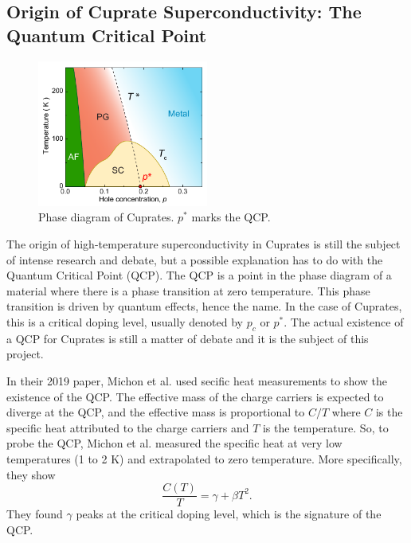 \subsection{Origin of Cuprate Superconductivity: The Quantum Critical Point}
\begin{figure}
    \centering
    \includegraphics[width=0.5\textwidth]{figures/phase_diagram}
    \caption{Phase diagram of Cuprates. $p^*$ marks the QCP.}
    \label{fig:phase_diagram}
\end{figure}

The origin of high-temperature superconductivity in Cuprates is still the subject of intense
research and debate, but a possible explanation has to do with the Quantum Critical Point (QCP).
The QCP is a point in the phase diagram of a material where there is a phase transition at zero
temperature. This phase transition is driven by quantum effects, hence the name. In the case of
Cuprates, this is a critical doping level, usually denoted by $p_c$ or $p^*$. The actual existence
of a QCP for Cuprates is still a matter of debate and it is the subject of this project.

In their 2019 paper, Michon et al. \cite{michon2019} used secific heat measurements to
show the existence of the QCP. The effective mass of the charge carriers is expected to diverge at
the QCP, and the effective mass is proportional to $C/T$ where $C$ is the specific heat attributed
to the charge carriers and $T$ is the temperature. So, to probe the QCP, Michon et al. measured
the specific heat at very low temperatures (1 to 2 K) and extrapolated to zero temperature. More
specifically, they show
\begin{equation}
    \frac{C(T)}{T} = \gamma + \beta T^2.
\end{equation}
They found $\gamma$ peaks at the critical doping level, which is the signature of the QCP.